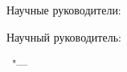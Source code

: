 %
\vspace{0pt plus4fill} %
\begin{flushright}
  \ifdefined\supervisorTwoFio
    Научные руководители:

    \supervisorRegalia

    \ifdefined\supervisorDead
      \framebox{\supervisorFio}
    \else
      \supervisorFio
    \fi

    \supervisorTwoRegalia

    \ifdefined\supervisorTwoDead
      \framebox{\supervisorTwoFio}
    \else
      \supervisorTwoFio
    \fi
  \else
    Научный руководитель:

    \supervisorRegalia

    \ifdefined\supervisorDead
      \framebox{\supervisorFio}
    \else
      \supervisorFio
    \fi
  \fi

\end{flushright}
%
\vspace{0pt plus4fill} %
{\centering\thesisCity\ "--- \thesisYear\par}
